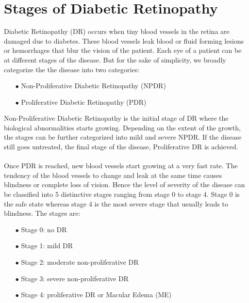 \documentclass[12pt]{report}
\begin{document}
\section{Stages of Diabetic Retinopathy}
Diabetic Retinopathy (DR) occurs when tiny blood vessels in the retina are damaged
due to diabetes. These blood vessels leak blood or fluid forming lesions or hemorrhages that blur the vision of the patient. Each eye of a patient can be at different
stages of the disease. But for the sake of simplicity, we broadly categorize the the
disease into two categories:
\begin{itemize}
	\item[$\bullet$] Non-Proliferative Diabetic Retinopathy (NPDR)
	\item[$\bullet$] Proliferative Diabetic Retinopathy (PDR)
\end{itemize}
Non-Proliferative Diabetic Retinopathy is the initial stage of DR where the biological abnormalities starts growing. Depending on the extent of the growth, the stages can be further
categorized into mild and severe NPDR. If the disease still goes untreated, the final
stage of the disease, Proliferative DR is achieved.\\
\\Once PDR is reached, new blood vessels start growing at a very fast rate. The
tendency of the blood vessels to change and leak at the same time causes blindness
or complete loss of vision. Hence the level of severity of the disease can be classified
into 5 distinctive stages ranging from stage 0 to stage 4. Stage 0 is the safe state
whereas stage 4 is the most severe stage that usually leads to blindness. The stages
are:
\newpage
\begin{itemize}
	\item[$\bullet$] Stage 0: no DR
	\item[$\bullet$] Stage 1: mild DR
	\item[$\bullet$] Stage 2: moderate non-proliferative DR
	\item[$\bullet$] Stage 3: severe non-proliferative DR
	\item[$\bullet$] Stage 4: proliferative DR or Macular Edema (ME)
\end{itemize}
\end{document}
